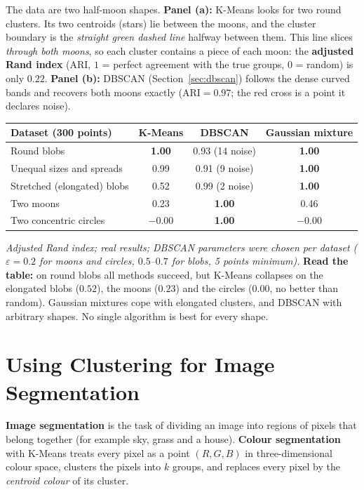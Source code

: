 \begin{explain}
The data are two half-moon shapes. \textbf{Panel (a):} K-Means looks for two round clusters. Its two centroids (stars) lie between the moons, and the cluster boundary is the \emph{straight green dashed line} halfway between them. This line slices \emph{through both moons}, so each cluster contains a piece of each moon: the \textbf{adjusted Rand index} (ARI, $1$ = perfect agreement with the true groups, $0$ = random) is only $0.22$. \textbf{Panel (b):} DBSCAN (Section~\ref{sec:dbscan}) follows the dense curved bands and recovers both moons exactly ($\text{ARI}=0.97$; the red cross is a point it declares noise).
\end{explain}

\begin{center}
\begin{tabular}{@{}lccc@{}}
\toprule
\textbf{Dataset (300 points)} & \textbf{K-Means} & \textbf{DBSCAN} & \textbf{Gaussian mixture}\\
\midrule
Round blobs & \textbf{1.00} & 0.93 (14 noise) & \textbf{1.00}\\
Unequal sizes and spreads & 0.99 & 0.91 (9 noise) & \textbf{1.00}\\
Stretched (elongated) blobs & 0.52 & 0.99 (2 noise) & \textbf{1.00}\\
Two moons & 0.23 & \textbf{1.00} & 0.46\\
Two concentric circles & $-0.00$ & \textbf{1.00} & $-0.00$\\
\bottomrule
\end{tabular}
\end{center}

\noindent \textit{Adjusted Rand index; real results; DBSCAN parameters were chosen per dataset ($\varepsilon=0.2$ for moons and circles, $0.5$--$0.7$ for blobs, 5 points minimum).} \textbf{Read the table:} on round blobs all methods succeed, but K-Means collapses on the elongated blobs ($0.52$), the moons ($0.23$) and the circles ($0.00$, no better than random). Gaussian mixtures cope with elongated clusters, and DBSCAN with arbitrary shapes. No single algorithm is best for every shape.

\section{Using Clustering for Image Segmentation}\label{sec:seg}

\begin{definition}
\textbf{Image segmentation} is the task of dividing an image into regions of pixels that belong together (for example sky, grass and a house). \textbf{Colour segmentation} with K-Means treats every pixel as a point $(R,G,B)$ in three-dimensional colour space, clusters the pixels into $k$ groups, and replaces every pixel by the \emph{centroid colour} of its cluster.
\end{definition}

